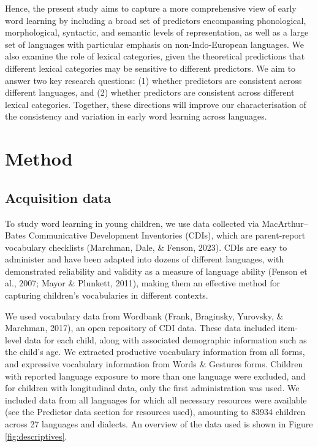 \documentclass[10pt, letterpaper]{article}
\begin{document}
Hence, the present study aims to capture a more comprehensive view of
early word learning by including a broad set of predictors encompassing
phonological, morphological, syntactic, and semantic levels of
representation, as well as a large set of languages with particular
emphasis on non-Indo-European languages. We also examine the role of
lexical categories, given the theoretical predictions that different
lexical categories may be sensitive to different predictors. We aim to
answer two key research questions: (1) whether predictors are consistent
across different languages, and (2) whether predictors are consistent
across different lexical categories. Together, these directions will
improve our characterisation of the consistency and variation in early
word learning across languages.

\hypertarget{method}{%
\section{Method}\label{method}}

\hypertarget{acquisition-data}{%
\subsection{Acquisition data}\label{acquisition-data}}

To study word learning in young children, we use data collected via
MacArthur--Bates Communicative Development Inventories (CDIs), which are
parent-report vocabulary checklists (Marchman, Dale, \& Fenson, 2023).
CDIs are easy to administer and have been adapted into dozens of
different languages, with demonstrated reliability and validity as a
measure of language ability (Fenson et al., 2007; Mayor \& Plunkett,
2011), making them an effective method for capturing children's
vocabularies in different contexts.

We used vocabulary data from Wordbank (Frank, Braginsky, Yurovsky, \&
Marchman, 2017), an open repository of CDI data. These data included
item-level data for each child, along with associated demographic
information such as the child's age. We extracted productive vocabulary
information from all forms, and expressive vocabulary information from
Words \& Gestures forms. Children with reported language exposure to
more than one language were excluded, and for children with longitudinal
data, only the first administration was used. We included data from all
languages for which all necessary resources were available (see the
Predictor data section for resources used), amounting to 83934 children
across 27 languages and dialects. An overview of the data used is shown
in Figure \ref{fig:descriptives}.
\end{document}
